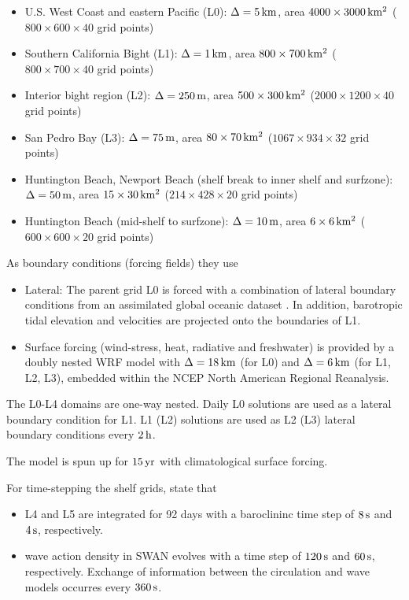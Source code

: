\documentclass[12pt,a4paper]{article}
\begin{document}
\begin{itemize}
	\item U.S. West Coast and eastern Pacific (L0):  $\Delta=5\,\rm km$, area $4000\times3000\,\rm km^2$ ($800\times600\times40$ grid points)
	\item Southern California Bight (L1):  $\Delta=1\,\rm km$, area $800\times700\,\rm km^2$ ($800\times700\times40$ grid points)
	\item Interior bight region (L2): $\Delta=250\,\rm m$, area $500\times300\,\rm km^2$ ($2000\times1200\times40$ grid points)
	\item San Pedro Bay (L3): $\Delta=75\,\rm m$, area $80\times70\,\rm km^2$ ($1067\times934\times32$ grid points)
	\item Huntington Beach, Newport Beach (shelf break to inner shelf and surfzone): $\Delta=50\,\rm m$, area $15\times30\,\rm km^2$ ($214\times428\times20$ grid points)
	\item Huntington Beach (mid-shelf to surfzone): $\Delta=10\,\rm m$, area $6\times6\,\rm km^2$ ($600\times600\times20$ grid points)
\end{itemize}

As boundary conditions (forcing fields) they use

\begin{itemize}
	\item Lateral: The parent grid L0 is forced with a combination of lateral boundary conditions from an assimilated global oceanic dataset \citep{carton2008reanalysis}. In addition, barotropic tidal elevation and velocities are projected onto the boundaries of L1.
	
	\item Surface forcing (wind-stress, heat, radiative and freshwater) is provided by a doubly nested WRF model with $\Delta=18\,\rm km$ (for L0) and $\Delta=6\,\rm km$ (for L1, L2, L3), embedded within the NCEP North American Regional Reanalysis.
\end{itemize}

The L0-L4 domains are one-way nested. Daily L0 solutions are used as a lateral boundary condition for L1. L1 (L2) solutions are used as L2 (L3) lateral boundary conditions every $2\,\rm h$.

The model is spun up for $15\,\rm yr$ with climatological surface forcing.


For time-stepping the shelf grids, \cite{kumar2015midshelf} state that

\begin{itemize}
	\item L4 and L5 are integrated for 92 days with a baroclininc time step of $8\,\rm s$ and $4\,\rm s$, respectively.
	\item wave action density in SWAN evolves with a time step of $120\,\rm s$ and $60\,\rm s$, respectively. Exchange of information between the circulation and wave models occurres every $360\,\rm s$.
\end{itemize}
\end{document}
